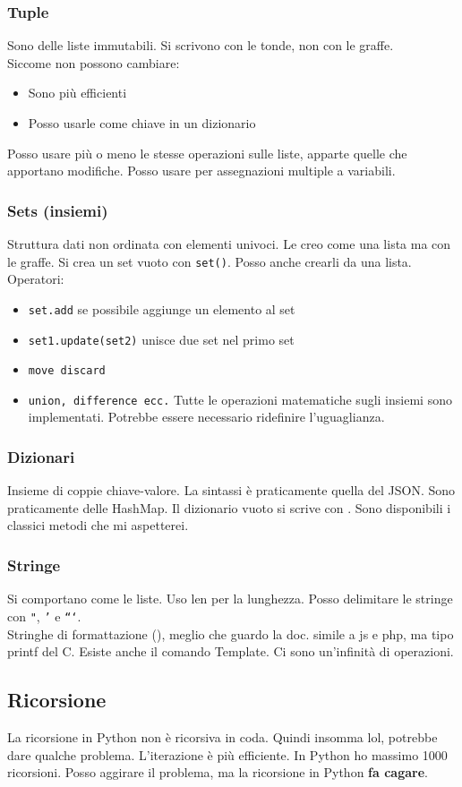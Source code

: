 \documentclass[a4paper,12pt]{article}
\newcommand{\pyRef}[1]{{\color{blue}{DIP pg#1}}}
\begin{document}
\subsubsection{Tuple}
Sono delle liste immutabili. Si scrivono con le tonde, non con le graffe.\\
Siccome non possono cambiare:
\begin{itemize}
 \item Sono più efficienti
 \item Posso usarle come chiave in un dizionario
\end{itemize}
Posso usare più o meno le stesse operazioni sulle liste, apparte quelle che apportano modifiche. Posso usare per assegnazioni multiple a variabili.

\subsubsection{Sets (insiemi)}
Struttura dati non ordinata con elementi univoci. Le creo come una lista ma con le graffe. Si crea un set vuoto con \texttt{set()}. Posso anche crearli da una lista.
Operatori:
\begin{itemize}
	\item \texttt{set.add} se possibile aggiunge un elemento al set
	\item \texttt{set1.update(set2)} unisce due set nel primo set
	\item \texttt{move discard}
	\item \texttt{union, difference ecc.} Tutte le operazioni matematiche sugli insiemi sono implementati. Potrebbe essere necessario ridefinire l'uguaglianza.
\end{itemize}

\subsubsection{Dizionari}
Insieme di coppie chiave-valore. La sintassi è praticamente quella del JSON. Sono praticamente delle HashMap. Il dizionario vuoto si scrive con \texttt{{}}. Sono disponibili i classici metodi che mi aspetterei.

\subsubsection{Stringe}
Si comportano come le liste. Uso len per la lunghezza. Posso delimitare le stringe con \texttt{"}, \texttt{'} e \texttt{```}.\\
Stringhe di formattazione (\pyRef{114}), meglio che guardo la doc. \E simile a js e php, ma tipo printf del C. Esiste anche il comando Template. Ci sono un'infinità di operazioni.


\subsection{Ricorsione}
La ricorsione in Python non è ricorsiva in coda. Quindi insomma lol, potrebbe dare qualche problema. L'iterazione è più efficiente. In Python ho massimo 1000 ricorsioni. Posso aggirare il problema, ma la ricorsione in Python \textbf{fa cagare}.
\end{document}

